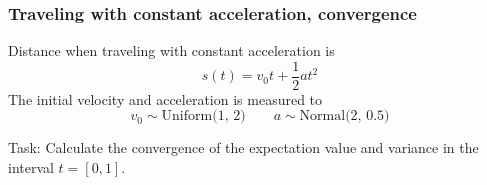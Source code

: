 \documentclass{beamer}
\begin{document}
\begin{frame}
\frametitle{Traveling with constant acceleration, convergence}
 Distance when traveling with constant acceleration is
 \[s(t) = v_0t + \frac{1}{2}at^2\]
The initial velocity and acceleration is measured to
\[v_0 \sim \text{Uniform(1, 2)} \qquad a \sim \text{Normal(2, 0.5)}\]
\begin{alert}{Task:}
 Calculate the convergence of the expectation value and variance in the interval $t=[0,1]$.
\end{alert}
\end{frame}
\
  
\end{document}
